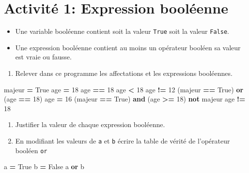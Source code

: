 \documentclass[
]{book}
\newenvironment{Shaded}{\begin{snugshade}}{\end{snugshade}}
\newcommand{\DecValTok}[1]{\textcolor[rgb]{0.00,0.00,0.81}{#1}}
\newcommand{\KeywordTok}[1]{\textcolor[rgb]{0.13,0.29,0.53}{\textbf{#1}}}
\newcommand{\NormalTok}[1]{#1}
\newcommand{\OperatorTok}[1]{\textcolor[rgb]{0.81,0.36,0.00}{\textbf{#1}}}
\newcommand{\VariableTok}[1]{\textcolor[rgb]{0.00,0.00,0.00}{#1}}
\providecommand{\tightlist}{%
  \setlength{\itemsep}{0pt}\setlength{\parskip}{0pt}}
\def\tightlist{}
\begin{document}
\hypertarget{activituxe9-1-expression-booluxe9enne}{%
\section{Activité 1: Expression booléenne}\label{activituxe9-1-expression-booluxe9enne}}

\begin{itemize}
\tightlist
\item
  Une variable booléenne contient soit la valeur \texttt{True} soit la valeur \texttt{False}.
\item
  Une expression booléenne contient au moins un opérateur booléen sa valeur est vraie ou fausse.
\end{itemize}

\begin{enumerate}
\def\labelenumi{\arabic{enumi}.}
\tightlist
\item
  Relever dans ce programme les affectations et les expressions booléennes.
\end{enumerate}

\begin{Shaded}
\begin{Highlighting}[]
\NormalTok{majeur }\OperatorTok{=} \VariableTok{True}
\NormalTok{age }\OperatorTok{=} \DecValTok{18}
\NormalTok{age }\OperatorTok{==} \DecValTok{18}
\NormalTok{age }\OperatorTok{\textless{}} \DecValTok{18}
\NormalTok{age }\OperatorTok{!=} \DecValTok{12}
\NormalTok{(majeur }\OperatorTok{==} \VariableTok{True}\NormalTok{) }\KeywordTok{or}\NormalTok{ (age }\OperatorTok{==} \DecValTok{18}\NormalTok{)}
\NormalTok{age }\OperatorTok{=} \DecValTok{16}
\NormalTok{(majeur }\OperatorTok{==} \VariableTok{True}\NormalTok{) }\KeywordTok{and}\NormalTok{ (age }\OperatorTok{\textgreater{}=} \DecValTok{18}\NormalTok{)}
\KeywordTok{not}\NormalTok{ majeur}
\NormalTok{age }\OperatorTok{!=} \DecValTok{18}
\end{Highlighting}
\end{Shaded}

\begin{enumerate}
\def\labelenumi{\arabic{enumi}.}
\setcounter{enumi}{1}
\tightlist
\item
  Justifier la valeur de chaque expression booléenne.
\item
  En modifiant les valeurs de \texttt{a} et \texttt{b} écrire la table de vérité de l'opérateur booléen \texttt{or}
\end{enumerate}

\begin{Shaded}
\begin{Highlighting}[]
\NormalTok{a }\OperatorTok{=} \VariableTok{True}
\NormalTok{b }\OperatorTok{=} \VariableTok{False}
\NormalTok{a }\KeywordTok{or}\NormalTok{ b}
\end{Highlighting}
\end{Shaded}
\end{document}
